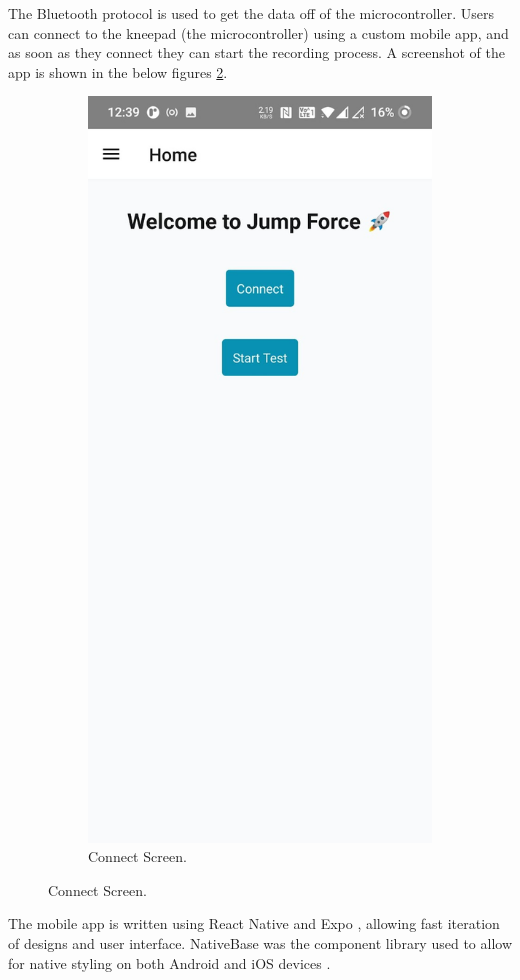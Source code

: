 \documentclass[manuscript,screen,review]{acmart}
\begin{document}
The Bluetooth protocol is used to get the data off of the microcontroller. Users can connect to the kneepad (the microcontroller) using a custom mobile app, and as soon as they connect they can start the recording process. A screenshot of the app is shown in the below figures \ref{fig:app_screens_1}.

\begin{figure}[ht]
  \centering
  \begin{subfigure}{0.5\textwidth}
    \centering
    \includegraphics[width=0.55\linewidth]{images/connect_screen.jpg}
    \caption{Connect Screen.}
    \label{fig:app_screens_1}
  \end{subfigure}
\end{figure}

The mobile app is written using React Native \cite{react-native} and Expo \cite{expo-documentation}, allowing fast iteration of designs and user interface. NativeBase was the component library used to allow for native styling on both Android and iOS devices \cite{nativebase}.
\end{document}
